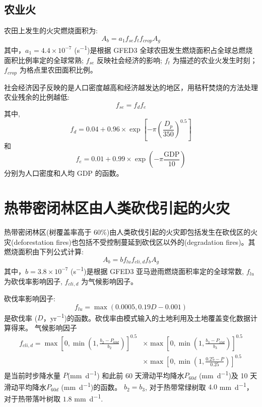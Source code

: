 \subsection{农业火}

农田上发生的火灾燃烧面积为:  
\begin{equation}
A_{b}=a_{1} f_{s e} f_{t} f_{c r o p} A_{g}
\end{equation}
%
其中，$a_{1} =4.4\times10^{-7}$ (\unit{s^{-1}})是根据 GFED3 全球农田发生燃烧面积占全球总燃烧面积比例率定的全球常熟; $f_{se}$ 反映社会经济的影响; $f_t$ 为描述的农业火发生时刻；$f_{crop}$ 为格点里农田面积比例。


社会经济因子反映的是人口密度越高和经济越发达的地区，用秸秆焚烧的方法处理农业残余的比例越低:  
\begin{equation}
f_{se} = f_d f_e 
\end{equation}  
其中,  
\begin{equation}
f_{d}=0.04+0.96 \times \exp \left[-\pi\left(\frac{D_{p}}{350}\right)^{0.5}\right]
\end{equation}
和  
\begin{equation}
f_{e}=0.01+0.99 \times \exp \left(-\pi \frac{\text{GDP}}{10}\right)
\end{equation}
分别为人口密度和人均 GDP 的函数。


\section{热带密闭林区由人类砍伐引起的火灾}  
热带密闭林区(树覆盖率高于 60\%)由人类砍伐引起的火灾即包括发生在砍伐区的火灾(deforestation fires)也包括不受控制蔓延到砍伐区以外的(degradation fires)。其燃烧面积由下列公式计算:  
\begin{equation}
A_{b}=b f_{l u} f_{c l i, d} f_{b} A_{g}
\end{equation}
%
其中，$b =3.8\times10^{-7}$ (\unit{s^{-1}})是根据 GFED3 亚马逊雨燃烧面积率定的全球常数, $f_{lu}$ 为砍伐率影响因子, $f_{cli,d}$ 为气候影响因子。  

砍伐率影响因子: 
\begin{equation}
f_{lu} = \max(0.0005, 0.19D - 0.001)
\end{equation}  
是砍伐率 ($D$，\unit{yr^{-1}})的函数。砍伐率由模式输入的土地利用及土地覆盖变化数据计算得来。
气候影响因子
\begin{equation}
\begin{aligned}
f_{c l i, d}=\max\left[0, \min \left(1, \frac{b_{2}-P_{60 d}}{b_{2}}\right)\right]^{0.5}& \times\max\left[0, \min \left(1, \frac{b_{3}-P_{10 d}}{b_{3}}\right)\right]^{0.5}\\
& \times\max\left[0, \min \left(1, \frac{0.25-P}{0.25}\right)\right]^{0.5}
\end{aligned}
\end{equation}
是当前时步降水量 $P$(\unit{mm.d^{-1}}) 和此前 60 天滑动平均降水$P_{60 d}$ (\unit{mm.d^{-1}})及 10 天滑动平均降水$P_{60 d}$ (\unit{mm.d^{-1}})的函数。 $b_2 = b_3$, 对于热带常绿树取 $4.0$ \unit{mm.d^{-1}}，对于热带落叶树取 $1.8$ \unit{mm.d^{-1}}.


